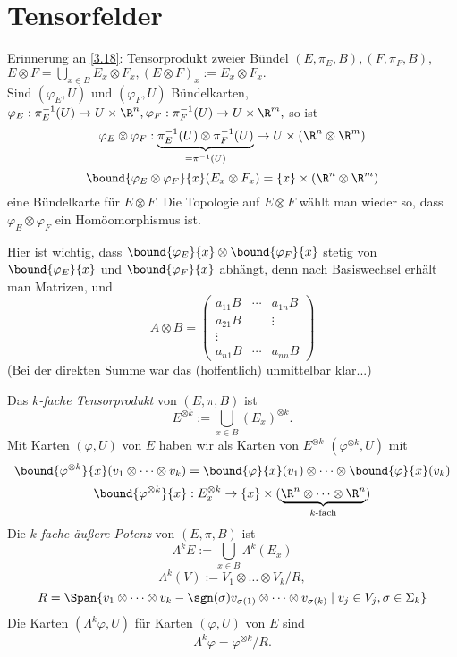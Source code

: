 \chapter{Tensorfelder}
\lecture

\begin{rem}
	Erinnerung an \ref{3.18}: Tensorprodukt zweier Bündel $ (E, \pi_E, B), (F, \pi_F,B)$, $E \otimes F = \bigcup_{x \in B} E_x \otimes F_x, (E \otimes F)_x := E_x \otimes F_x. $\\
	Sind $ (\varphi_E,U) $ und $(\varphi_F,U)$ Bündelkarten, $ \varphi_E: \pi_E^{-1}(U) \to U \times \R^n, \varphi_F: \pi_F^{-1}(U) \to U \times \R^m, $ so ist
	\[ \varphi_E \otimes \varphi_F: \underbrace{\pi_E^{-1}(U) \otimes \pi_F^{-1}(U)}_{= \pi^{-1}(U)} \to U \times (\R^n \otimes \R^m) \]
	\[ \bound{\varphi_E \otimes \varphi_F}{x}(E_x \otimes F_x) = \{x\} \times (\R^n \otimes \R^m) \]
	eine Bündelkarte für $E \otimes F$. Die Topologie auf $E \otimes F$ wählt man wieder so, dass $\varphi_E \otimes \varphi_F$ ein Homöomorphismus ist.
\end{rem}

\begin{rem*}
	Hier ist wichtig, dass $ \bound{\varphi_E}{x} \otimes  \bound{\varphi_F}{x} $ stetig von $ \bound{\varphi_E}{x} $ und $ \bound{\varphi_F}{x} $ abhängt, denn nach Basiswechsel erhält man Matrizen, und
	\[ A \otimes B = \begin{pmatrix}
		a_{11}B & \cdots & a_{1n}B\\
		a_{21}B & 		& \vdots\\
		\vdots &	&\\
		a_{n1}B & \cdots & a_{nn}B
	\end{pmatrix} \]
	(Bei der direkten Summe war das (hoffentlich) unmittelbar klar...)
\end{rem*}

\begin{defn}
	Das \emph{$k$-fache Tensorprodukt} von $ (E,\pi,B) $ ist
	\[ E^{\otimes k} := \bigcup_{x \in B} (E_x)^{\otimes k}. \]
	Mit Karten $(\varphi,U)$ von $E$ haben wir als Karten von $E^{\otimes k}$ $(\varphi^{\otimes k},U)$ mit
	\[ \bound{\varphi^{\otimes k}}{x} (v_1 \otimes \dots \otimes v_k) = \bound{\varphi}{x}(v_1) \otimes \dots \otimes \bound{\varphi}{x}(v_k) \]
	\[ \bound{\varphi^{\otimes k}}{x}: E_x^{\otimes k} \to \{x\} \times (\underbrace{\R^n \otimes \dots \otimes \R^n}_{k\text{-fach}}) \]
	Die \emph{$k$-fache äußere Potenz} von $(E,\pi,B)$ ist
	\[ \Lambda^k E:= \bigcup_{x \in B} \Lambda^k(E_x) \]
	\[ \Lambda^k(V) := V_1 \otimes \dots \otimes V_k / R, \]
	\[ R = \Span\{v_1 \otimes \dots \otimes v_k - \sgn(\sigma) v_{\sigma(1)} \otimes \dots \otimes v_{\sigma(k)} \mid v_j \in V_j, \sigma \in \Sigma_k\} \]
	Die Karten $(\Lambda^k\varphi,U)$ für Karten $(\varphi,U)$ von $E$ sind
	\[ \Lambda^k\varphi = \varphi^{\otimes k}/R. \]
\end{defn}

